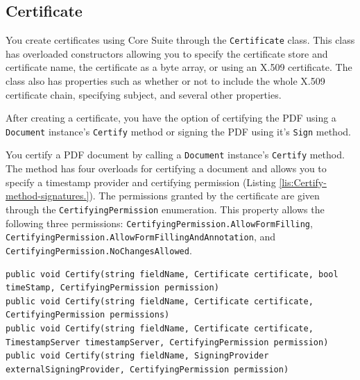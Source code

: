 \documentclass[american]{tufte-book}
\numberwithin{equation}{section}
\numberwithin{figure}{section}
\begin{document}
{\subsection{Certificate}

You create certificates using Core Suite through the \texttt{Certificate}
class. This class has overloaded constructors allowing you to specify
the certificate store and certificate name, the certificate as a byte
array, or using an X.509 certificate. The class also has properties
such as whether or not to include the whole X.509 certificate chain,
specifying subject, and several other properties.

After creating a certificate, you have the option of certifying the
PDF using a \texttt{Document} instance's \texttt{Certify} method or
signing the PDF using it's \texttt{Sign} method. 

You certify a PDF document by calling a \texttt{Document} instance's
\texttt{Certify} method. The method has four overloads for certifying
a document and allows you to specify a timestamp provider  and certifying permission (Listing \ref{lis:Certify-method-signatures.}).
The permissions granted by the certificate are given through the \texttt{CertifyingPermission}
enumeration. This property allows the following three permissions:
\texttt{CertifyingPermission.AllowFormFilling}, \texttt{CertifyingPermission.AllowFormFillingAndAnnotation},
and \texttt{CertifyingPermission.NoChangesAllowed}.

\bgroup{}
\begin{lstlisting}[caption={Certify method signatures.},label={lis:Certify-method-signatures.},basicstyle={\footnotesize\ttfamily},breaklines=true]
public void Certify(string fieldName, Certificate certificate, bool timeStamp, CertifyingPermission permission)
public void Certify(string fieldName, Certificate certificate, CertifyingPermission permissions)
public void Certify(string fieldName, Certificate certificate, TimestampServer timestampServer, CertifyingPermission permission)
public void Certify(string fieldName, SigningProvider externalSigningProvider, CertifyingPermission permission)
\end{lstlisting}
\leavevmode\egroup


}
\end{document}
